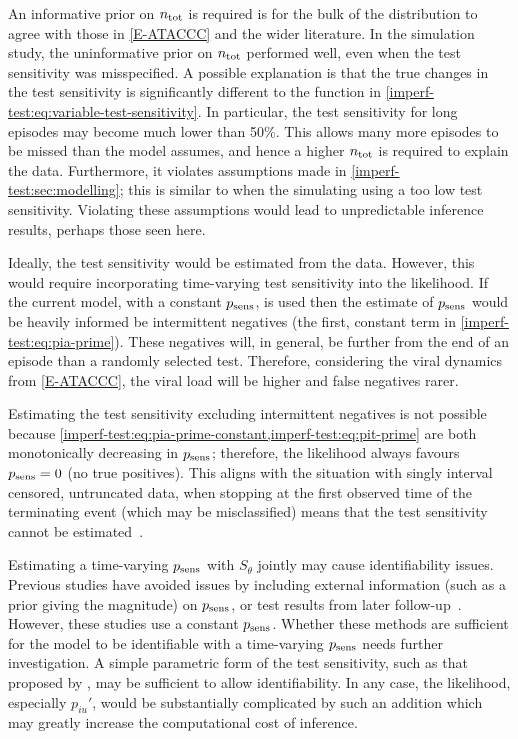 \documentclass[thesis.tex]{subfiles}
\begin{document}
An informative prior on $n_\text{tot}$ is required is for the bulk of the distribution to agree with those in \cref{E-ATACCC} and the wider literature.
In the simulation study, the uninformative prior on $n_\text{tot}$ performed well, even when the test sensitivity was misspecified.
A possible explanation is that the true changes in the test sensitivity is significantly different to the function in \cref{imperf-test:eq:variable-test-sensitivity}.
In particular, the test sensitivity for long episodes may become much lower than 50\%.
This allows many more episodes to be missed than the model assumes, and hence a higher $n_\text{tot}$ is required to explain the data.
Furthermore, it violates assumptions made in \cref{imperf-test:sec:modelling}; this is similar to when the simulating using a too low test sensitivity.
Violating these assumptions would lead to unpredictable inference results, perhaps those seen here.

Ideally, the test sensitivity would be estimated from the data.
However, this would require incorporating time-varying test sensitivity into the likelihood.
If the current model, with a constant $p_\text{sens}$, is used then the estimate of $p_\text{sens}$ would be heavily informed be intermittent negatives (the first, constant term in \cref{imperf-test:eq:pia-prime}).
These negatives will, in general, be further from the end of an episode than a randomly selected test.
Therefore, considering the viral dynamics from \cref{E-ATACCC}, the viral load will be higher and false negatives rarer.

Estimating the test sensitivity excluding intermittent negatives is not possible because \cref{imperf-test:eq:pia-prime-constant,imperf-test:eq:pit-prime} are both monotonically decreasing in $p_\text{sens}$; therefore, the likelihood always favours $p_\text{sens} = 0$ (\ie no true positives).
This aligns with the situation with singly interval censored, untruncated data, when stopping at the first observed time of the terminating event (which may be misclassified) means that the test sensitivity cannot be estimated~\autocite[e.g.]{titmanMisclassify}.

Estimating a time-varying $p_\text{sens}$ with $S_\theta$ jointly may cause identifiability issues.
Previous studies have avoided issues by including external information (such as a prior giving the magnitude) on $p_\text{sens}$, or test results from later follow-up~\autocite[and references therein]{piresIntervalMisclassify}.
However, these studies use a constant $p_\text{sens}$.
Whether these methods are sufficient for the model to be identifiable with a time-varying $p_\text{sens}$ needs further investigation.
A simple parametric form of the test sensitivity, such as that proposed by \textcite{brownBayesian}, may be sufficient to allow identifiability.
In any case, the likelihood, especially $p_{iu}'$, would be substantially complicated by such an addition which may greatly increase the computational cost of inference.
\end{document}
